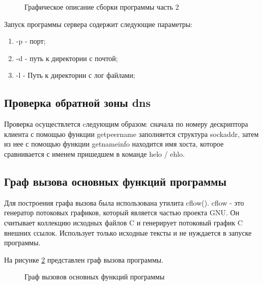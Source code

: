 \documentclass[a4paper,12pt]{report}
\begin{document}
\begin{figure}[h!]
\caption{Графическое описание сборки программы часть 2}
\label{ris:mkflow_second}
\end{figure}

Запуск программы сервера содержит следующие параметры:
\begin{enumerate}
	\item -p - порт;
    \item -d - путь к директории с почтой;
    \item -l - Путь к директории с лог файлами;
\end{enumerate}



\subsection{Проверка обратной зоны dns}

Проверка осуществлется cледующим образом: сначала по номеру  дескриптора клиента с помощью функции getpeername заполняется структура sockaddr, затем из нее с помощью функции getnameinfo находится имя хоста, которое сравнивается с именем пришедшем в команде helo / ehlo.

\subsection{Граф вызова основных функций программы}

Для построения графа вызова была использована утилита cflow(\cite{cflow}). cflow - это генератор потоковых графиков, который является частью проекта GNU. Он считывает коллекцию исходных файлов C и генерирует потоковый график C внешних ссылок. Использует только исходные тексты и не нуждается в запуске программы.

На рисунке \ref{ris:calls} представлен граф вызова программы.

\begin{figure}[h!]
\caption{Граф вызовов основных функций программы}
\label{ris:calls}
\end{figure}
\end{document}
